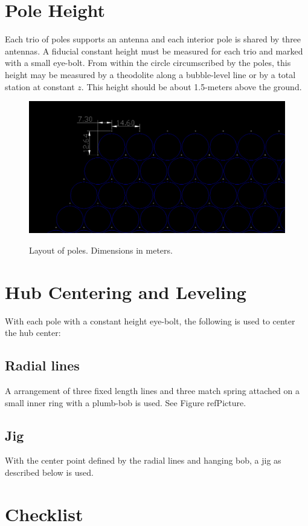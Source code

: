 \documentclass[11pt]{article}
\begin{document}
\section{Pole Height}
Each trio of poles supports an antenna and each interior pole is shared by three antennas.  A fiducial constant height must be measured for each trio and marked with a small eye-bolt.  From within the circle circumscribed by the poles, this height may be measured by a theodolite along a bubble-level line or by a total station at constant $z$.  This height should be about 1.5-meters above the ground.
\begin{figure}[H]
\includegraphics[width=\textwidth]{graphics/poles_and_ants.png}
\label{fig:poles_ants}
\caption{Layout of poles.  Dimensions in meters.}
\end{figure}

\section{Hub Centering and Leveling}
With each pole with a constant height eye-bolt, the following is used to center the hub center:
\subsection{Radial lines}
A arrangement of three fixed length lines and three match spring attached on a small inner ring with a plumb-bob is used. See Figure refPicture.

\subsection{Jig}
With the center point defined by the radial lines and hanging bob, a jig as described below is used.

\newpage
\appendix
\section{Checklist}
\end{document}
